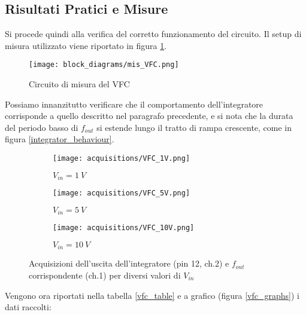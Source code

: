 
\subsection*{Risultati Pratici e Misure}


Si procede quindi alla verifica del corretto funzionamento del circuito. Il setup di
misura utilizzato viene riportato in figura \ref{mis_VFC}.

\begin{figure}[H]
    \centering
    \texttt{[image: block\_diagrams/mis\_VFC.png]}
    \caption{Circuito di misura del VFC}
    \label{mis_VFC}
\end{figure}

Possiamo innanzitutto verificare che il comportamento dell'integratore corrisponde a quello
descritto nel paragrafo precedente, e si nota che la durata del periodo basso di $f_{out}$
si estende lungo il tratto di rampa crescente, come in figura \ref{integrator_behaviour}.

\begin{figure}[H]
    \centering

    \begin{subfigure}{.5\textwidth}
        \centering
        \texttt{[image: acquisitions/VFC\_1V.png]}
        \caption{$V_{in}=1\ V$}
        \label{acq_vfc110_1v}
    \end{subfigure}%
    \begin{subfigure}{.5\textwidth}
        \centering
        \texttt{[image: acquisitions/VFC\_5V.png]}
        \caption{$V_{in}=5\ V$}
        \label{acq_vfc110_5v}
    \end{subfigure}
    \begin{subfigure}{.5\textwidth}
        \centering
        \texttt{[image: acquisitions/VFC\_10V.png]}
        \caption{$V_{in}=10\ V$}
        \label{acq_vfc110_10v}
    \end{subfigure}

    \caption{Acquisizioni dell'uscita dell'integratore (pin 12, ch.2) e $f_{out}$
        corrispondente (ch.1) per diversi valori di $V_{in}$}
    \label{acq_vfc110}
\end{figure}

Vengono ora riportati nella tabella \ref{vfc_table} e a grafico (figura \ref{vfc_graphs})
i dati raccolti:

